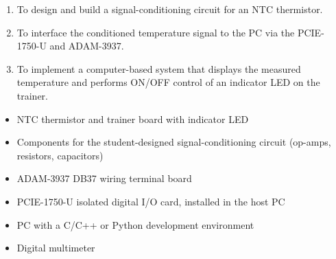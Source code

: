 
\begin{objectives}
  \begin{enumerate}
    \item To design and build a signal-conditioning circuit for an NTC thermistor.
    \item To interface the conditioned temperature signal to the PC via the PCIE-1750-U and ADAM-3937.
    \item To implement a computer-based system that displays the measured temperature and performs ON/OFF control of an indicator LED on the trainer.
  \end{enumerate}
\end{objectives}

\begin{equipment}
  \begin{itemize}
    \item NTC thermistor and trainer board with indicator LED
    \item Components for the student-designed signal-conditioning circuit (op-amps, resistors, capacitors)
    \item ADAM-3937 DB37 wiring terminal board
    \item PCIE-1750-U isolated digital I/O card, installed in the host PC
    \item PC with a C/C++ or Python development environment
    \item Digital multimeter
  \end{itemize}
\end{equipment}

